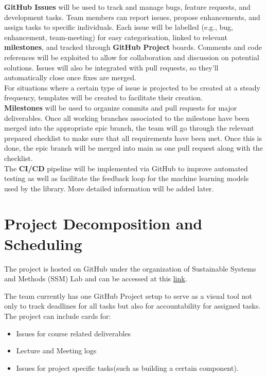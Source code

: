 \documentclass{article}
\begin{document}
\noindent
\textbf{GitHub Issues} will be used to track and manage bugs, feature requests, and development tasks. Team members can report issues, propose enhancements, and assign tasks to specific individuals. Each issue will be labelled (e.g., bug, enhancement, team-meeting) for easy categorisation, linked to relevant \textbf{milestones}, and tracked through \textbf{GitHub Project} boards. Comments and code references will be exploited to allow for collaboration and discussion on potential solutions. Issues will also be integrated with pull requests, so they’ll automatically close once fixes are merged. \\

\noindent
For situations where a certain type of issue is projected to be created at a steady frequency, templates will be created to facilitate their creation. \\

\noindent
\textbf{Milestones} will be used to organize commits and pull requests for major deliverables. Once all working branches associated to the milestone have been merged into the appropriate epic branch, the team will go through the relevant prepared checklist to make sure that all requirements have been met. Once this is done, the epic branch will be merged into main as one pull request along with the checklist. \\

\noindent
The \textbf{CI/CD} pipeline will be implemented via GitHub to improve automated testing as well as facilitate the feedback loop for the machine learning models used by the library. More detailed information will be added later. \\

\section{Project Decomposition and Scheduling}

\hspace{\parindent} The project is hosted on GitHub under the organization of Sustainable Systems and Methods (SSM) Lab and can be accessed at this \href{https://github.com/ssm-lab/capstone--source-code-optimizer}{link}.

The team currently has one GitHub Project setup to serve as a visual tool not only to track deadlines for all tasks but also for accountability  for assigned tasks. The project can include cards for:
\begin{itemize}
  \item Issues for course related deliverables
  \item Lecture and Meeting logs
  \item Issues for project specific tasks(such as building a certain component).
\end{itemize}
\end{document}
